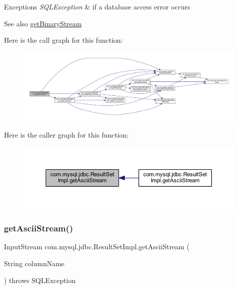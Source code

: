 \begin{DoxyExceptions}{Exceptions}
{\em S\+Q\+L\+Exception} & if a database access error occurs\\
\hline
\end{DoxyExceptions}
\begin{DoxySeeAlso}{See also}
\mbox{\hyperlink{classcom_1_1mysql_1_1jdbc_1_1_result_set_impl_a59faa6b2172c9dafdc26ea397bc4fc93}{get\+Binary\+Stream}} 
\end{DoxySeeAlso}
Here is the call graph for this function\+:
\nopagebreak
\begin{figure}[H]
\begin{center}
\leavevmode
\includegraphics[width=350pt]{classcom_1_1mysql_1_1jdbc_1_1_result_set_impl_a3121b8b483b8b8bfcdf6b1b977a60808_cgraph}
\end{center}
\end{figure}
Here is the caller graph for this function\+:
\nopagebreak
\begin{figure}[H]
\begin{center}
\leavevmode
\includegraphics[width=350pt]{classcom_1_1mysql_1_1jdbc_1_1_result_set_impl_a3121b8b483b8b8bfcdf6b1b977a60808_icgraph}
\end{center}
\end{figure}
\mbox{\label{classcom_1_1mysql_1_1jdbc_1_1_result_set_impl_a87d456ff8fb48adfb5a12005afc51787}} 
\subsubsection{\texorpdfstring{get\+Ascii\+Stream()}{getAsciiStream()}\hspace{0.1cm}{\footnotesize\ttfamily [2/2]}}
{\footnotesize\ttfamily Input\+Stream com.\+mysql.\+jdbc.\+Result\+Set\+Impl.\+get\+Ascii\+Stream (\begin{DoxyParamCaption}\item[{String}]{column\+Name }\end{DoxyParamCaption}) throws S\+Q\+L\+Exception}


